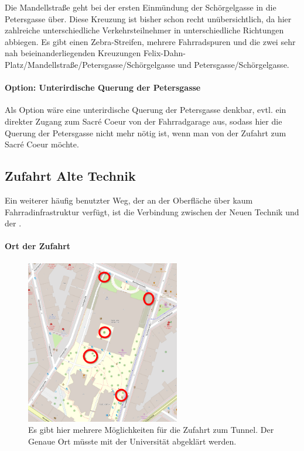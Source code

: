 Die Mandellstraße geht bei der ersten Einmündung der Schörgelgasse in die Petersgasse über. Diese Kreuzung ist bisher schon recht unübersichtlich, da hier zahlreiche unterschiedliche Verkehrsteilnehmer in unterschiedliche Richtungen abbiegen. Es gibt einen Zebra-Streifen, mehrere Fahrradspuren und die zwei sehr nah beieinanderliegenden Kreuzungen Felix-Dahn-Platz/Mandellstraße/Petersgasse/Schörgelgasse und Petersgasse/Schörgelgasse.

\paragraph{Option: Unterirdische Querung der Petersgasse}
Als Option wäre eine unterirdische Querung der Petersgasse denkbar, evtl. ein direkter Zugang zum Sacré Coeur von der Fahrradgarage aus, sodass hier die Querung der Petersgasse nicht mehr nötig ist, wenn man von der Zufahrt zum Sacré Coeur möchte.

\subsection{Zufahrt Alte Technik}
Ein weiterer häufig benutzter Weg, der an der Oberfläche über kaum Fahrradinfrastruktur verfügt, ist die Verbindung zwischen der Neuen Technik und der .

\paragraph{Ort der Zufahrt}
\begin{figure}
    \centering
    \includegraphics[width=0.6\textwidth]{main/bike/tunnel/uni/zufahrt_alte_technik}
    \caption[Zufahrten Alte Technik]{Es gibt hier mehrere Möglichkeiten für die Zufahrt zum Tunnel. Der Genaue Ort müsste mit der Universität abgeklärt werden.}
\end{figure}

